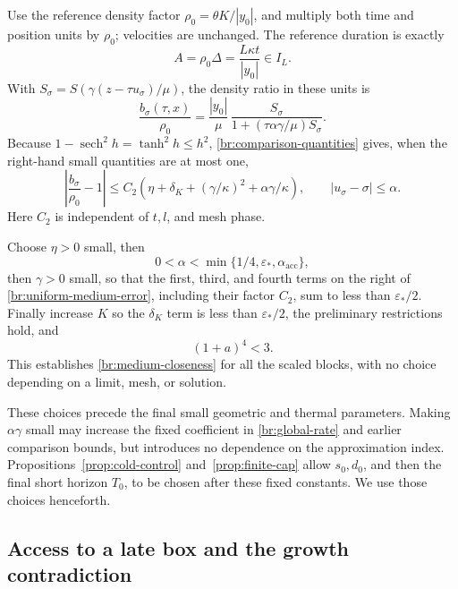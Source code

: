 Use the reference density factor \(\rho_0=\theta K/|y_0|\), and
multiply both time and position units by \(\rho_0\); velocities are
unchanged. The reference duration is exactly
\begin{equation}\label{br:duration-scaling}
A=\rho_0\Delta=\frac{L\kappa t}{|y_0|}\in I_L.
\end{equation}
With \(S_\sigma=S(\gamma(z-\tau u_\sigma)/\mu)\), the density ratio
in these units is
\begin{equation}\label{br:density-ratio}
\frac{b_\sigma(\tau,x)}{\rho_0}
=\frac{|y_0|}{\mu}\,
\frac{S_\sigma}{1+(\tau\alpha\gamma/\mu)S_\sigma}.
\end{equation}
Because \(1-\operatorname{sech}^2 h=\tanh^2h\le h^2\),
\eqref{br:comparison-quantities} gives, when the right-hand small
quantities are at most one,
\begin{equation}\label{br:uniform-medium-error}
\left|\frac{b_\sigma}{\rho_0}-1\right|
\le C_2\left(\eta+\delta_K+
              (\gamma/\kappa)^2+\alpha\gamma/\kappa\right),
\qquad |u_\sigma-\sigma|\le\alpha.
\end{equation}
Here \(C_2\) is independent of \(t,l\), and mesh phase.

Choose \(\eta>0\) small, then
\[
0<\alpha<\min\{1/4,\varepsilon_*,\alpha_{\mathrm{acc}}\},
\]
then \(\gamma>0\) small, so that the first, third, and fourth terms
on the right of \eqref{br:uniform-medium-error}, including their factor
\(C_2\), sum to less than \(\varepsilon_*/2\).
Finally increase \(K\) so the \(\delta_K\) term is less than
\(\varepsilon_*/2\), the preliminary restrictions hold, and
\begin{equation}\label{br:growth-exponent}
(1+a)^4<3.
\end{equation}
This establishes \eqref{br:medium-closeness} for all the scaled blocks,
with no choice depending on a limit, mesh, or solution.

These choices precede the final small geometric and thermal parameters.
Making \(\alpha\gamma\) small may increase the fixed coefficient in
\eqref{br:global-rate} and earlier comparison bounds, but introduces no
dependence on the approximation index.
Propositions~\ref{prop:cold-control} and~\ref{prop:finite-cap} allow
\(s_0,d_0\), and then the final short horizon \(T_0\), to be chosen
after these fixed constants. We use those choices henceforth.

\subsection{Access to a late box and the growth contradiction}

